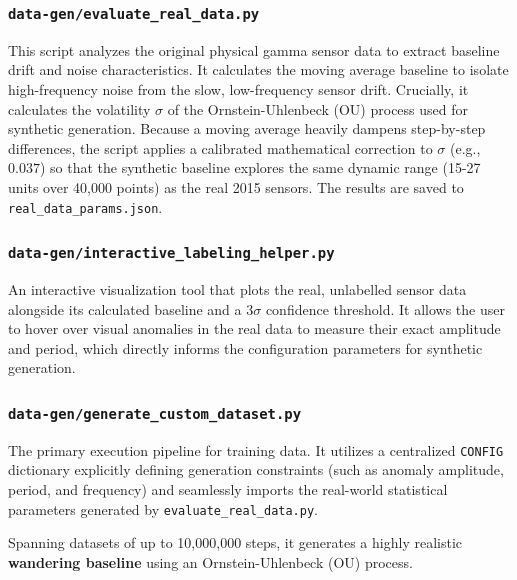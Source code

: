 \subsubsection{\texttt{data-gen/evaluate\_real\_data.py}}
This script analyzes the original physical gamma sensor data to extract baseline drift and noise characteristics. It calculates the moving average baseline to isolate high-frequency noise from the slow, low-frequency sensor drift. Crucially, it calculates the volatility $\sigma$ of the Ornstein-Uhlenbeck (OU) process used for synthetic generation. Because a moving average heavily dampens step-by-step differences, the script applies a calibrated mathematical correction to $\sigma$ (e.g., $0.037$) so that the synthetic baseline explores the same dynamic range (15-27 units over 40,000 points) as the real 2015 sensors. The results are saved to \texttt{real\_data\_params.json}.

\subsubsection{\texttt{data-gen/interactive\_labeling\_helper.py}}
An interactive visualization tool that plots the real, unlabelled sensor data alongside its calculated baseline and a $3\sigma$ confidence threshold. It allows the user to hover over visual anomalies in the real data to measure their exact amplitude and period, which directly informs the configuration parameters for synthetic generation.

\subsubsection{\texttt{data-gen/generate\_custom\_dataset.py}}
The primary execution pipeline for training data. It utilizes a centralized \texttt{CONFIG} dictionary explicitly defining generation constraints (such as anomaly amplitude, period, and frequency) and seamlessly imports the real-world statistical parameters generated by \texttt{evaluate\_real\_data.py}. 

Spanning datasets of up to 10,000,000 steps, it generates a highly realistic \textbf{wandering baseline} using an Ornstein-Uhlenbeck (OU) process. 

